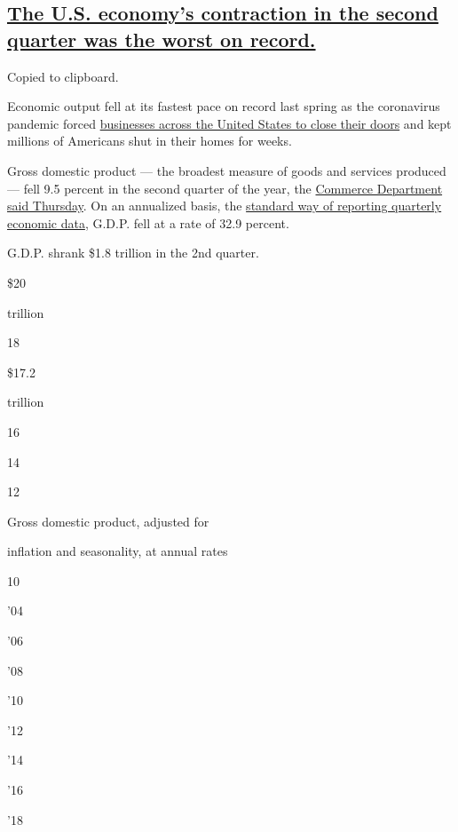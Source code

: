 \hypertarget{the-us-economys-contraction-in-the-second-quarter-was-the-worst-on-record}{%
\subsection{\texorpdfstring{\protect\hyperlink{the-us-economys-contraction-in-the-second-quarter-was-the-worst-on-record}{The
U.S. economy's contraction in the second quarter was the worst on
record.}}{The U.S. economy's contraction in the second quarter was the worst on record.}}\label{the-us-economys-contraction-in-the-second-quarter-was-the-worst-on-record}}

Copied to clipboard.

Economic output fell at its fastest pace on record last spring as the
coronavirus pandemic forced
\href{https://www.nytimes.com/2020/07/17/business/economy/how-to-save-economy.html?action=click\&module=RelatedLinks\&pgtype=Article}{businesses
across the United States to close their doors} and kept millions of
Americans shut in their homes for weeks.

Gross domestic product --- the broadest measure of goods and services
produced --- fell 9.5 percent in the second quarter of the year, the
\href{https://www.bea.gov/sites/default/files/2020-07/gdp2q20_adv.pdf}{Commerce
Department said Thursday}. On an annualized basis, the
\href{https://www.nytimes.com/2020/07/29/business/economy/us-gdp-report.html}{standard
way of reporting quarterly economic data}, G.D.P. fell at a rate of 32.9
percent.

G.D.P. shrank \$1.8 trillion in the 2nd quarter.

\$20

trillion

18

\$17.2

trillion

16

14

12

Gross domestic product, adjusted for

inflation and seasonality, at annual rates

10

'04

'06

'08

'10

'12

'14

'16

'18

